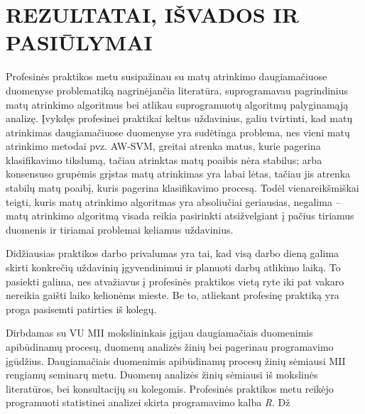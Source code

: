
\section{REZULTATAI, IŠVADOS IR PASIŪLYMAI}
\label{rezultatai_isvados_pasiulymai}

Profesinės praktikos metu susipažinau su matų atrinkimo daugiamačiuose duomenyse problematiką nagrinėjančia literatūra, suprogramavau pagrindinius matų atrinkimo algoritmus bei atlikau suprogramuotų algoritmų palyginamąją analizę. Įvykdęs profesinei praktikai keltus uždavinius, galiu tvirtinti, kad matų atrinkimas daugiamačiuose duomenyse yra sudėtinga problema, nes vieni matų atrinkimo metodai pvz. AW-SVM, greitai atrenka matus, kurie pagerina klasifikavimo tikslumą, tačiau atrinktas matų poaibis nėra stabilus; arba konsensuso grupėmis grįstas matų atrinkimas yra labai lėtas, tačiau jis atrenka stabilų matų poaibį, kuris pagerina klasifikavimo procesą. Todėl vienareikšmiškai teigti, kuris matų atrinkimo algoritmas yra absoliučiai geriausias, negalima -- matų atrinkimo algoritmą visada reikia pasirinkti atsižvelgiant į pačius tiriamus duomenis ir tiriamai problemai keliamus uždavinius.

Didžiausias praktikos darbo privalumas yra tai, kad visą darbo dieną galima skirti konkrečių uždavinių įgyvendinimui ir planuoti darbų atlikimo laiką. To pasiekti galima, nes atvažiavus į profesinės praktikos vietą ryte iki pat vakaro nereikia gaišti laiko kelionėms mieste. Be to, atliekant profesinę praktiką yra proga pasisemti patirties iš kolegų. 

Dirbdamas su VU MII mokslininkais įgijau daugiamačiais duomenimis apibūdinamų procesų, duomenų analizės žinių bei pagerinau programavimo įgūdžius. Daugiamačiais duomenimis apibūdinamų procesų žinių sėmiausi MII rengiamų seminarų metu. Duomenų analizės žinių sėmiausi iš mokslinės literatūros, bei konsultacijų su kolegomis. Profesinės praktikos metu reikėjo programuoti statistinei analizei skirta programavimo kalba \textit{R}. Dž

